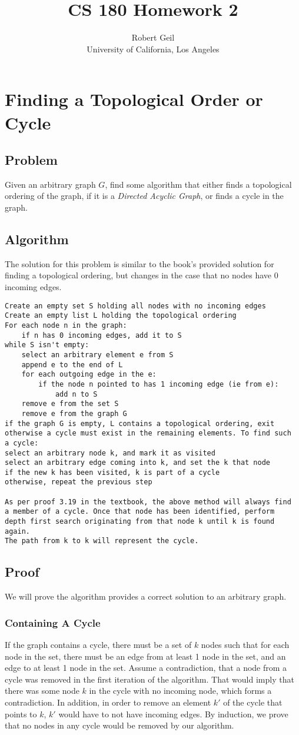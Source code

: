 \documentclass[titlepage]{article}
\title{CS 180 Homework 2}
\author{Robert Geil \\
University of California, Los Angeles
}
\numberwithin{equation}{subsection}
\begin{document}
\maketitle
\section{Finding a Topological Order or Cycle}
\subsection{Problem}
Given an arbitrary graph $G$, find some algorithm that either
finds a topological ordering of the graph, if it is a \textit{Directed 
Acyclic Graph}, or finds a cycle in the graph. 
\subsection{Algorithm}
The solution for this problem is similar to the book's provided
solution for finding a topological ordering, but changes in the
case that no nodes have 0 incoming edges.
\begin{lstlisting}
Create an empty set S holding all nodes with no incoming edges
Create an empty list L holding the topological ordering
For each node n in the graph:
    if n has 0 incoming edges, add it to S
while S isn't empty:
    select an arbitrary element e from S
    append e to the end of L
    for each outgoing edge in the e:
        if the node n pointed to has 1 incoming edge (ie from e):
            add n to S
    remove e from the set S
    remove e from the graph G
if the graph G is empty, L contains a topological ordering, exit
otherwise a cycle must exist in the remaining elements. To find such
a cycle:
select an arbitrary node k, and mark it as visited
select an arbitrary edge coming into k, and set the k that node
if the new k has been visited, k is part of a cycle
otherwise, repeat the previous step

As per proof 3.19 in the textbook, the above method will always find
a member of a cycle. Once that node has been identified, perform
depth first search originating from that node k until k is found again.
The path from k to k will represent the cycle.
\end{lstlisting}
\subsection{Proof}
We will prove the algorithm provides a correct solution to an arbitrary
graph.
\subsubsection{Containing A Cycle}
If the graph contains a cycle, there must be a set of $k$ nodes
such that for each node in the set, there must be an edge from
at least 1 node in the set, and an edge to at least 1 node in the
set. Assume a contradiction, that a node from a cycle was removed in
the first iteration of the algorithm. That would imply that there was
some node $k$ in the cycle with no incoming node, which forms a contradiction.
In addition, in order to remove an element $k'$ of the cycle that points to $k$,
$k'$ would have to not have incoming edges. By induction, we prove that
no nodes in any cycle would be removed by our algorithm.
\end{document}
